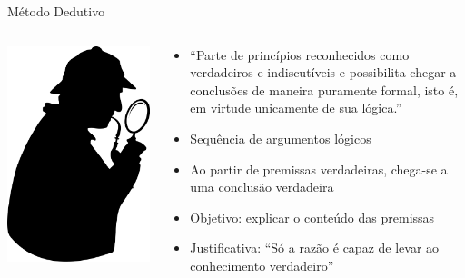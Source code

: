 \documentclass{beamer}
\begin{document}
\begin{frame}{Método Dedutivo}
  \begin{columns}
    \begin{column}{3cm}
    \includegraphics[width=\textwidth]{Metodos/sherlock_holmes}
    \end{column}
    \begin{column}{7.5cm}
      \begin{itemize}
      \item ``Parte de princípios reconhecidos como verdadeiros e
        indiscutíveis e possibilita chegar a conclusões de maneira
        puramente formal, isto é, em virtude unicamente de sua
        lógica.''
      \item Sequência de argumentos lógicos
      \item Ao partir de premissas verdadeiras, chega-se a uma
        conclusão verdadeira
      \item Objetivo: explicar o conteúdo das premissas
      \item Justificativa: ``Só a razão é capaz de levar ao
        conhecimento verdadeiro''
      \end{itemize}
  \end{column}
\end{columns}
\end{frame}
\end{document}
